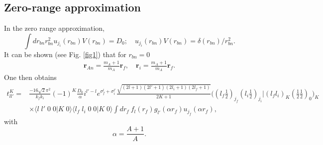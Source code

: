 \subsection{Zero-range approximation}\label{S4.1.2}
In the zero range approximation,
\begin{equation}\label{eq_onept29}
\int dr_{bn} r_{bn}^2 u_{j_i}(r_{bn})V(r_{bn})=D_0;\quad u_{j_i}(r_{bn})V(r_{bn})=\delta(r_{bn})/r_{bn}^2.
\end{equation}
It can be shown (see Fig. \ref{fig1}) that for $r_{bn}=0$
\begin{equation}\label{eq_onept30}
\begin{split}
\mathbf{r}_{An}=\frac{m_A+1}{m_A}\mathbf{r}_f,\quad
\mathbf{r}_i=\frac{m_A+1}{m_A}\mathbf{r}_f.
\end{split}
\end{equation}
One then obtains
\begin{equation}\label{eq_onept31}
\begin{split}
t_{ll'}^K=&\frac{-16\sqrt{2}\pi^2}{k_f k_i}(-1)^K \frac{D_0}{\alpha} i^{l'-l}e^{\sigma_f^l+\sigma_i^{l'}}\frac{\sqrt{(2l+1)(2l'+1)(2l_i+1)(2l_f+1)}}{2K+1}\bigl((l_f \tfrac{1}{2})_{j_f}(l_i \tfrac{1}{2})_{j_i}|(l_f l_i)_K(\tfrac{1}{2} \tfrac{1}{2})_0\bigr)_K\\
&\times\langle l\;l'\;0\;0|K\;0\rangle\langle l_f\;l_i\;0\;0|K\;0\rangle\int dr_f\ f_l(r_f)g_{l'}(\alpha r_f)u_{j_f}(\alpha r_f),
\end{split}
\end{equation}
with 
\begin{equation}\label{eq_onept32}
\alpha=\frac{A+1}{A}.
\end{equation}


